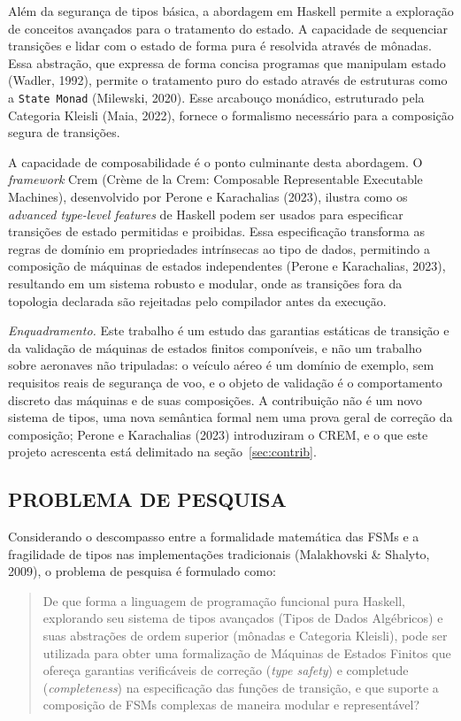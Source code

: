 \documentclass[12pt,a4paper]{article}
\begin{document}
Além da segurança de tipos básica, a abordagem em Haskell permite a exploração de conceitos avançados para o tratamento do estado. A capacidade de sequenciar transições e lidar com o estado de forma pura é resolvida através de mônadas. Essa abstração, que expressa de forma concisa programas que manipulam estado (Wadler, 1992), permite o tratamento puro do estado através de estruturas como a \texttt{State Monad} (Milewski, 2020). Esse arcabouço monádico, estruturado pela Categoria Kleisli (Maia, 2022), fornece o formalismo necessário para a composição segura de transições.

A capacidade de composabilidade é o ponto culminante desta abordagem. O \textit{framework} Crem (Crème de la Crem: Composable Representable Executable Machines), desenvolvido por Perone e Karachalias (2023), ilustra como os \textit{advanced type-level features} de Haskell podem ser usados para especificar transições de estado permitidas e proibidas. Essa especificação transforma as regras de domínio em propriedades intrínsecas ao tipo de dados, permitindo a composição de máquinas de estados independentes (Perone e Karachalias, 2023), resultando em um sistema robusto e modular, onde as transições fora da topologia declarada são rejeitadas pelo compilador antes da execução.

\textit{Enquadramento.} Este trabalho é um estudo das garantias estáticas de transição e da validação de máquinas de estados finitos componíveis, e não um trabalho sobre aeronaves não tripuladas: o veículo aéreo é um domínio de exemplo, sem requisitos reais de segurança de voo, e o objeto de validação é o comportamento discreto das máquinas e de suas composições. A contribuição não é um novo sistema de tipos, uma nova semântica formal nem uma prova geral de correção da composição; Perone e Karachalias (2023) introduziram o CREM, e o que este projeto acrescenta está delimitado na seção~\ref{sec:contrib}.

\subsection{PROBLEMA DE PESQUISA}

Considerando o descompasso entre a formalidade matemática das FSMs e a fragilidade de tipos nas implementações tradicionais (Malakhovski \& Shalyto, 2009), o problema de pesquisa é formulado como:

\begin{quote}
   De que forma a linguagem de programação funcional pura Haskell, explorando seu sistema de tipos avançados (Tipos de Dados Algébricos) e suas abstrações de ordem superior (mônadas e Categoria Kleisli), pode ser utilizada para obter uma formalização de Máquinas de Estados Finitos que ofereça garantias verificáveis de correção (\textit{type safety}) e completude (\textit{completeness}) na especificação das funções de transição, e que suporte a composição de  FSMs complexas  de maneira modular e representável? 
\end{quote}
\end{document}

